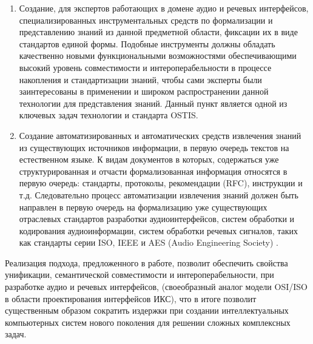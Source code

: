\begin{enumerate}
  \item Создание, для экспертов работающих в домене аудио и речевых интерфейсов, специализированных инструментальных средств по формализации и представлению знаний из данной предметной области, фиксации их в виде стандартов единой формы. Подобные инструменты должны обладать качественно новыми функциональными возможностями обеспечивающими высокий уровень совместимости и интероперабельности в процессе накопления и стандартизации знаний, чтобы сами эксперты были заинтересованы в применении и широком распространении данной технологии для представления знаний. Данный пункт является одной из ключевых задач технологии и стандарта OSTIS.
  \item Создание автоматизированных и автоматических средств извлечения знаний из существующих источников информации, в первую очередь текстов на естественном языке. К видам документов в которых, содержаться уже структурированная и отчасти формализованная информация относятся в первую очередь: стандарты, протоколы,  рекомендации (RFC), инструкции и т.д. Следовательно процесс автоматизации извлечения знаний должен быть направлен в первую очередь на формализацию уже существующих отраслевых стандартов разработки аудиоинтерфейсов, систем обработки и кодирования аудиоинформации, систем обработки речевых сигналов, таких как стандарты серии ISO, IEEE и AES (Audio Engineering Society) .
\end{enumerate}

Реализация подхода, предложенного в работе, позволит обеспечить свойства унификации, семантической совместимости и интероперабельности, при разработке аудио и речевых интерфейсов, (своеобразный аналог модели OSI/ISO в области проектирования интерфейсов ИКС), что в итоге позволит существенным образом сократить издержки при создании интеллектуальных компьютерных систем нового поколения для решении сложных комплексных задач.


%